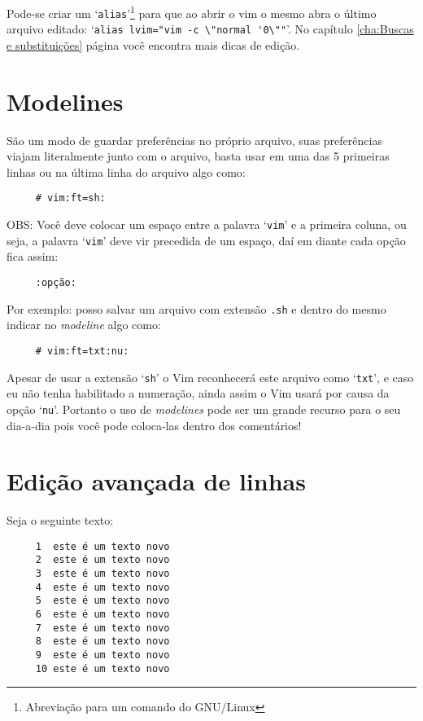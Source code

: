 {\Large {}} Pode-se criar um `{\tt alias}'\footnote{Abreviação para um
comando do GNU/Linux} para que ao abrir o vim o mesmo abra o último arquivo
editado: `\verb|alias lvim="vim -c \"normal '0\""|'.  No capítulo
\ref{cha:Buscas e substituições} página \pageref{cha:Buscas e substituições}
você encontra mais dicas de edição.


\section{Modelines}\label{sec:Modelines}

São um modo de guardar preferências no próprio arquivo, suas
preferências viajam literalmente junto com o arquivo, basta usar em
uma das 5 primeiras linhas ou na última linha do arquivo algo
como:

\begin{verbatim}
     # vim:ft=sh:
\end{verbatim}

OBS: Você deve colocar um espaço entre a palavra `{\tt vim}' e a primeira
coluna, ou seja, a palavra `{\tt vim}' deve vir precedida de um espaço, daí
em diante cada opção fica assim:

\begin{verbatim}
     :opção:
\end{verbatim}

Por exemplo: posso salvar um arquivo com extensão \verb|.sh| e dentro do
mesmo indicar no {\em modeline} algo como:

\begin{verbatim}
     # vim:ft=txt:nu:
\end{verbatim}

Apesar de usar a extensão `{\tt sh}' o Vim reconhecerá este arquivo como `{\tt txt}', e
caso eu não tenha habilitado a numeração, ainda assim o Vim usará por causa da
opção `{\tt nu}'.  Portanto o uso de {\em modelines} pode ser um grande recurso para o seu
dia-a-dia pois você pode coloca-las dentro dos comentários!

\section{Edição avançada de linhas}

Seja o seguinte texto:

\begin{verbatim}
     1  este é um texto novo
     2  este é um texto novo
     3  este é um texto novo
     4  este é um texto novo
     5  este é um texto novo
     6  este é um texto novo
     7  este é um texto novo
     8  este é um texto novo
     9  este é um texto novo
     10 este é um texto novo
\end{verbatim}

